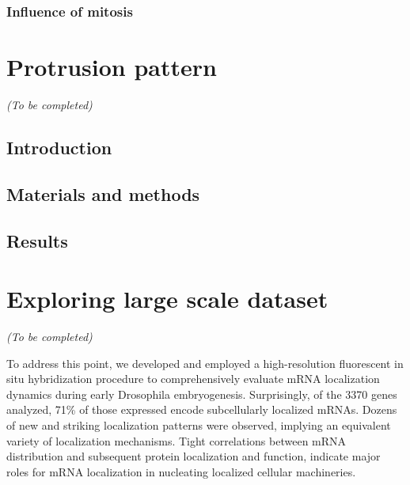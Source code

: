 \subsubsection{Influence of mitosis}

\section{Protrusion pattern}
\label{sec:protrusion}

\begin{center}
	\textit{(To be completed)}
\end{center}

\subsection{Introduction}
\label{subsec:introduction_protrusion}

\subsection{Materials and methods}
\label{subsec:materials_protrusion}

\subsection{Results}
\label{subsec:results_protrusion}

\section{Exploring large scale dataset}
\label{sec:exploration}

\begin{center}
	\textit{(To be completed)}
\end{center}


To address this point, we developed and employed a high-resolution fluorescent
in situ hybridization procedure to comprehensively evaluate mRNA localization
dynamics during early Drosophila embryogenesis. Surprisingly, of the 3370 genes
analyzed, 71\% of those expressed encode subcellularly localized mRNAs.
Dozens of new and striking localization patterns were observed, implying an
equivalent variety of localization mechanisms. Tight correlations between mRNA
distribution and subsequent protein localization and function, indicate major
roles for mRNA localization in nucleating localized cellular machineries.

